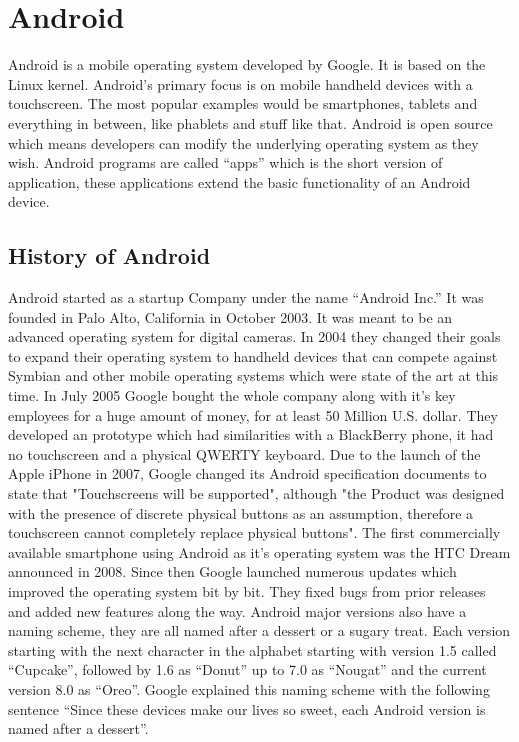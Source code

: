 \chapter{Android}
\label{ch:Android}
Android is a mobile operating system developed by Google. It is based on the Linux kernel. Android's primary focus is on mobile handheld devices with a touchscreen. The most popular examples would be smartphones, tablets and everything in between, like phablets and stuff like that. Android is open source which means developers can modify the underlying operating system as they wish. Android programs are called ``apps'' which is the short version of application, these applications extend the basic functionality of an Android device.

\section{History of Android}
Android started as a startup Company under the name ``Android Inc.'' It was founded in Palo Alto, California in October 2003. It was meant to be an advanced operating system for digital cameras. In 2004 they changed their goals to expand their operating system to handheld devices that can compete against Symbian and other mobile operating systems which were state of the art at this time. In July 2005 Google bought the whole company along with it's key employees for a huge amount of money, for at least 50 Million U.S. dollar. They developed an prototype which had similarities with a BlackBerry phone, it had no touchscreen and a physical QWERTY keyboard. Due to the launch of the Apple iPhone in 2007, Google changed its Android specification documents to state that "Touchscreens will be supported", although "the Product was designed with the presence of discrete physical buttons as an assumption, therefore a touchscreen cannot completely replace physical buttons". The first commercially available smartphone using Android as it's operating system was the HTC Dream announced in 2008. Since then Google launched numerous updates which improved the operating system bit by bit. They fixed bugs from prior releases and added new features along the way. Android major versions also have a naming scheme, they are all named after a dessert or a sugary treat. Each version starting with the next character in the alphabet starting with version 1.5 called ``Cupcake'', followed by 1.6 as ``Donut'' up to 7.0 as ``Nougat'' and the current version 8.0 as ``Oreo''. Google explained this naming scheme with the following sentence ``Since these devices make our lives so sweet, each Android version is named after a dessert''.

